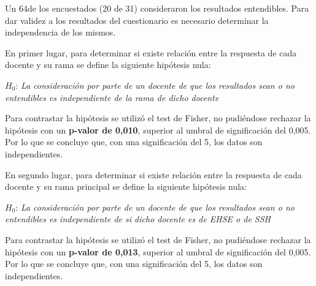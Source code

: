 Un 64\percentage{ }de los encuestados (20 de 31) consideraron los resultados entendibles. Para dar validez a los resultados del cuestionario es necesario determinar la independencia de los mismos.

En primer lugar, para determinar si existe relación entre la respuesta de cada docente y su rama se define la siguiente hipótesis nula:

\medskip
\begin{mdframed}[style=hipotesis0]
$H_0$: \emph{La consideración por parte de un docente de que los resultados sean o no entendibles es independiente de la rama de dicho docente}
\end{mdframed}

\medskip
Para contrastar la hipótesis se utilizó el test de Fisher, no pudiéndose rechazar la hipótesis con un \textbf{p-valor de 0,010}, superior al umbral de significación del 0,005. Por lo que se concluye que, con una significación del 5\percentage, los datos son independientes.

En segundo lugar, para determinar si existe relación entre la respuesta de cada docente y su rama principal se define la siguiente hipótesis nula:

\medskip
\begin{mdframed}[style=hipotesis0]
$H_0$: \emph{La consideración por parte de un docente de que los resultados sean o no entendibles es independiente de si dicho docente es de EHSE o de SSH}
\end{mdframed}

\medskip
Para contrastar la hipótesis se utilizó el test de Fisher, no pudiéndose rechazar la hipótesis con un \textbf{p-valor de 0,013}, superior al umbral de significación del 0,005. Por lo que se concluye que, con una significación del 5\percentage, los datos son independientes.
